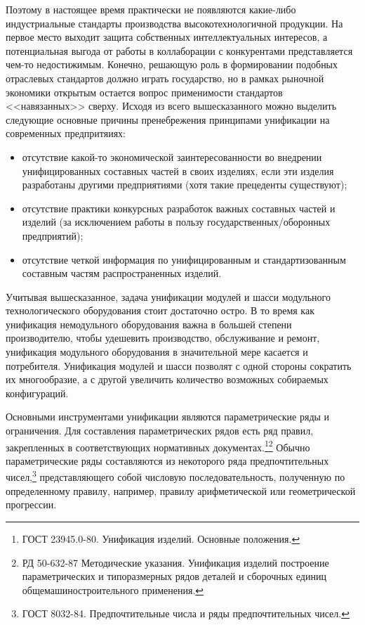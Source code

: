 Поэтому в настоящее время практически не появляются какие-либо индустриальные стандарты производства высокотехнологичной продукции. На первое место выходит защита собственных интеллектуальных интересов, а потенциальная выгода от работы в коллаборации с конкурентами представляется чем-то недостижимым. Конечно, решающую роль в формировании подобных отраслевых стандартов должно играть государство, но в рамках рыночной экономики открытым остается вопрос применимости стандартов <<навязанных>> сверху. Исходя из всего вышесказанного можно выделить следующие основные причины пренебрежения принципами унификации на современных предпритяиях:

\begin{itemize}
	\item отсутствие какой-то экономической заинтересованности во внедрении унифицированных составных частей в своих изделиях, если эти изделия разработаны другими предприятиями (хотя такие прецеденты существуют);
	\item отсутствие практики конкурсных разработок важных составных частей и изделий (за исключением работы в пользу государственных/оборонных предприятий);
	\item отсутствие четкой информация по унифицированным и стандартизованным составным частям распространенных изделий.
\end{itemize}

Учитывая вышесказанное, задача унификации модулей и шасси модульного технологического оборудования стоит достаточно остро. В то время как унификация немодульного оборудования важна в большей степени производителю, чтобы удешевить производство, обслуживание и ремонт, унификация модульного оборудования в значительной мере касается и потребителя. Унификация модулей и шасси позволят с одной стороны сократить их многообразие, а с другой увеличить количество возможных собираемых конфигураций. 

Основными инструментами унификации являются параметрические ряды и ограничения. Для составления параметрических рядов есть ряд правил, закрепленных в соответствующих нормативных документах.\footnote{ГОСТ 23945.0-80. Унификация изделий. Основные положения.}\footnote{РД 50-632-87 Методические указания. Унификация изделий построение параметрических и типоразмерных рядов деталей и сборочных единиц общемашиностроительного применения.} Обычно параметрические ряды составляются из некоторого ряда предпочтительных чисел,\footnote{ГОСТ 8032-84. Предпочтительные числа и ряды предпочтительных чисел.} представляющего собой числовую последовательность, полученную по определенному правилу, например, правилу арифметической или геометрической прогрессии.

